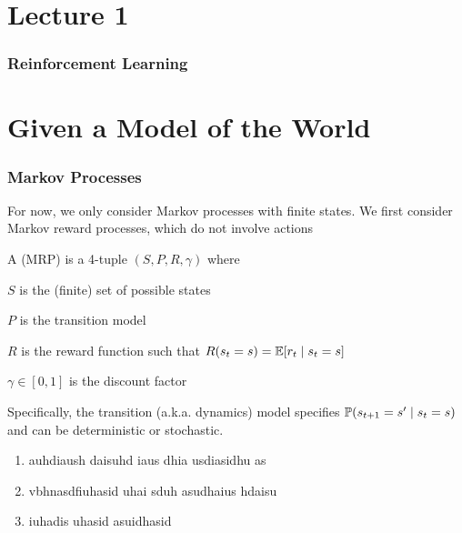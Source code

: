 \documentclass{styles/tufte}
\author{Jiaming (George) Yu}
\date{\today}
\begin{document}
\maketitle
\tableofcontents
\newpage




\part{Lecture 1}

\section{Reinforcement Learning}



\part{Given a Model of the World}

\section{Markov Processes}
  
  For now, we only consider Markov processes with finite states. We first consider Markov reward processes, which do not involve actions
  
  \begin{definition}{}{}
    A  (MRP) is a 4-tuple $(S, P, R, \gamma)$ where
    \begin{romanenum}
      \item $S$ is the (finite) set of possible states
      \item $P$ is the transition model
      \item $R$ is the reward function such that $R(s_t = s) = \operatorname{\mathbb{E}}[r_t \mid s_t = s]$
      \item $\gamma \in [0, 1]$ is the discount factor
    \end{romanenum}
  \end{definition}
  
  Specifically, the transition (a.k.a. dynamics) model specifies $\operatorname{\mathbb{P}}(s_{t+1} = s' \mid s_t = s)$ and can be deterministic or stochastic.
  
  \begin{enumerate}
    \item auhdiaush daisuhd iaus dhia usdiasidhu as
    \item vbhnasdfiuhasid uhai sduh asudhaius hdaisu
    \item iuhadis uhasid asuidhasid
  \end{enumerate}
  
\end{document}
